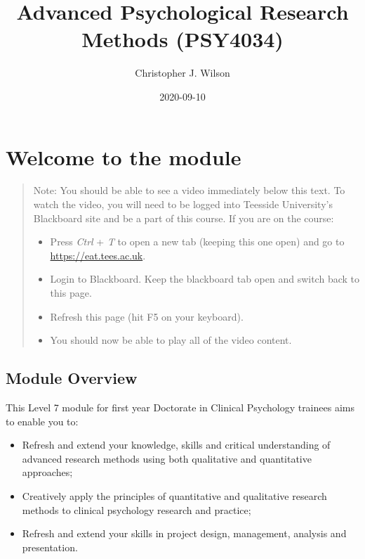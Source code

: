 \documentclass[
]{book}
\title{Advanced Psychological Research Methods (PSY4034)}
\author{Christopher J. Wilson}
\date{2020-09-10}
\providecommand{\tightlist}{%
  \setlength{\itemsep}{0pt}\setlength{\parskip}{0pt}}
\begin{document}
\maketitle

{
\setcounter{tocdepth}{1}
\tableofcontents
}
\hypertarget{welcome-to-the-module}{%
\chapter{Welcome to the module}\label{welcome-to-the-module}}

\begin{quote}
Note: You should be able to see a video immediately below this text. To watch the video, you will need to be logged into Teesside University's Blackboard site and be a part of this course. If you are on the course:

\begin{itemize}
\tightlist
\item
  Press \emph{Ctrl} + \emph{T} to open a new tab (keeping this one open) and go to \url{https://eat.tees.ac.uk}.
\item
  Login to Blackboard. Keep the blackboard tab open and switch back to this page.
\item
  Refresh this page (hit F5 on your keyboard).
\item
  You should now be able to play all of the video content.
\end{itemize}
\end{quote}

\hypertarget{module-overview}{%
\section{Module Overview}\label{module-overview}}

This Level 7 module for first year Doctorate in Clinical Psychology trainees aims to enable you to:

\begin{itemize}
\tightlist
\item
  Refresh and extend your knowledge, skills and critical understanding of advanced research methods using both qualitative and quantitative approaches;
\item
  Creatively apply the principles of quantitative and qualitative research methods to clinical psychology research and practice;
\item
  Refresh and extend your skills in project design, management, analysis and presentation.
\end{itemize}
\end{document}
